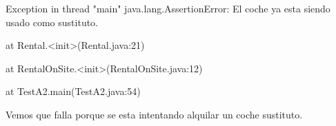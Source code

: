Exception in thread "main" java.lang.AssertionError: El coche ya esta siendo usado como sustituto.\par
	at Rental.<init>(Rental.java:21)\par
	at RentalOnSite.<init>(RentalOnSite.java:12)\par
	at TestA2.main(TestA2.java:54)\par
Vemos que falla porque se esta intentando alquilar un coche sustituto.\par
\newpage